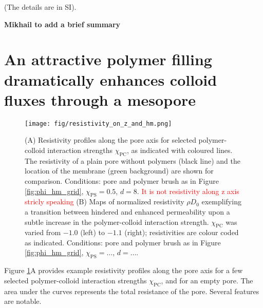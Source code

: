 \documentclass[12pt, a4paper]{article}
\newcommand\todo[1]{\textcolor{red}{#1}}
\begin{document}
(The details are in SI).






% 
{\bf Mikhail to add a brief summary}
%


\section{An attractive polymer filling dramatically enhances colloid fluxes through a mesopore}

\begin{figure}
    \centering
    \texttt{[image: fig/resistivity\_on\_z\_and\_hm.png]}
    \caption{
    (A) Resistivity profiles along the pore axis for selected polymer-colloid interaction strengths $\chi_{\text{PC}}$, as indicated with coloured lines. 
    The resistivity of a plain pore without polymers (black line) and the location of the membrane (green background) are shown for comparison. 
    Conditions: pore and polymer brush as in Figure \ref{fig:phi_hm_grid}, $\chi_{\text{PS}}=0.5$, $d=8$. \todo{It is not resistivity along z axis stricly speaking}
    (B) Maps of normalized resistivity $\rho D_0$ exemplifying a transition between hindered and enhanced permeability upon a subtle increase in the polymer-colloid interaction strength.
    $\chi_{\text{PC}}$ was varied from $-1.0$ (left) to $-1.1$ (right); resistivities are colour coded as indicated. 
    Conditions: pore and polymer brush as in Figure \ref{fig:phi_hm_grid}, $\chi_{\text{PS}}=\dots$, $d=\dots$.
    }
    \label{fig:R_map}
\end{figure}

Figure \ref{fig:R_map}A provides example resistivity profiles along the pore axis for a few selected polymer-colloid interaction strengths $\chi_{\text{PC}}$, and for an empty pore. 
The area under the curves represents the total resistance of the pore.
Several features are notable. 
\end{document}
